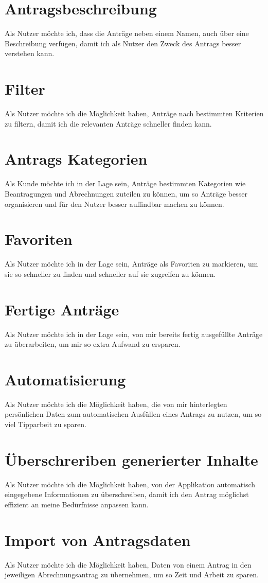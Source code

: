 \section{Antragsbeschreibung}
Als Nutzer möchte ich, dass die Anträge neben einem Namen, auch über eine Beschreibung verfügen, damit
ich als Nutzer den Zweck des Antrags besser verstehen kann.
\section{Filter}
Als Nutzer möchte ich die Möglichkeit haben, Anträge nach bestimmten Kriterien zu filtern, 
damit ich die relevanten Anträge schneller finden kann.
\section{Antrags Kategorien}
Als Kunde möchte ich in der Lage sein, Anträge bestimmten Kategorien wie Beantragungen und 
Abrechnungen zuteilen zu können, um so Anträge besser organisieren und für den Nutzer besser auffindbar machen zu können.
\section{Favoriten}
Als Nutzer möchte ich in der Lage sein, Anträge als Favoriten zu markieren, um sie so schneller zu 
finden und schneller auf sie zugreifen zu können.
\section{Fertige Anträge}
Als Nutzer möchte ich in der Lage sein, von mir bereits fertig ausgefüllte Anträge zu überarbeiten, um 
mir so extra Aufwand zu ersparen.
\section{Automatisierung}
Als Nutzer möchte ich die Möglichkeit haben, die von mir hinterlegten persönlichen Daten zum 
automatischen Ausfüllen eines Antrags zu nutzen, um so viel Tipparbeit zu sparen.
\section{Überschreriben generierter Inhalte}
Als Nutzer möchte ich die Möglichkeit haben, von der Applikation automatisch eingegebene Informationen 
zu überschreiben, damit ich den Antrag möglichst effizient an meine Bedürfnisse anpassen kann.
\section{Import von Antragsdaten}
Als Nutzer möchte ich die Möglichkeit haben, Daten von einem Antrag in den jeweiligen 
Abrechnungsantrag zu übernehmen, um so Zeit und Arbeit zu sparen.
